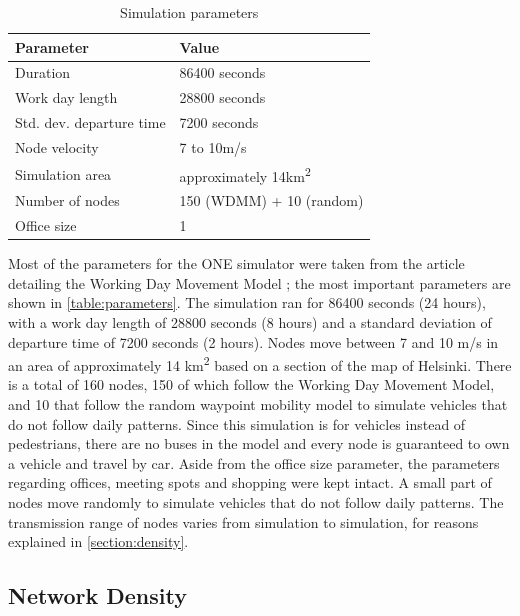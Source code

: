 \begin{table}[h!]
\caption{Simulation parameters}
\label{table:parameters}
\centering
\begin{tabular}{|p{5cm}||p{5cm}|}
 \hline
 \textbf{Parameter}	& \textbf{Value} \\
 \hline
 \hline
 Duration 			& 86400 seconds \\
 \hline
 Work day length 	& 28800 seconds \\
 \hline
 Std. dev. departure time & 7200 seconds \\
 \hline
 Node velocity 		& 7 to 10m/s \\
 \hline
 Simulation area	& approximately 14km\textsuperscript{2} \\
 \hline
 Number of nodes 	& 150 (WDMM) + 10 (random) \\
 \hline
 Office size 		& 1 \\
 \hline
\end{tabular}
\end{table}

Most of the parameters for the ONE simulator were taken from the article detailing the Working Day Movement Model \cite{ekman2008working}; the most important parameters are shown in \autoref{table:parameters}.
The simulation ran for 86400 seconds (24 hours), with a work day length of 28800 seconds (8 hours) and a standard deviation of departure time of 7200 seconds (2 hours).
Nodes move between 7 and 10 m/s in an area of approximately 14 km\textsuperscript{2} based on a section of the map of Helsinki.
There is a total of 160 nodes, 150 of which follow the Working Day Movement Model, and 10 that follow the random waypoint mobility model to simulate vehicles that do not follow daily patterns.
Since this simulation is for vehicles instead of pedestrians, there are no buses in the model and every node is guaranteed to own a vehicle and travel by car.
Aside from the office size parameter, the parameters regarding offices, meeting spots and shopping were kept intact.
A small part of nodes move randomly to simulate vehicles that do not follow daily patterns.
The transmission range of nodes varies from simulation to simulation, for reasons explained in \autoref{section:density}.

\subsection{Network Density}
\label{section:density}

